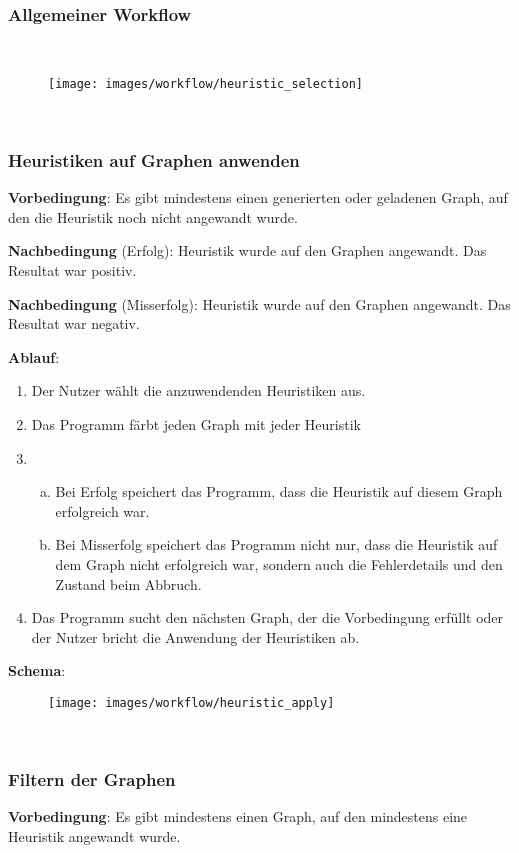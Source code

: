 \documentclass{article}
\begin{document}
	\FloatBarrier
	\subsubsection{Allgemeiner Workflow}
	~\begin{figure}[!h]
		\centering
		\texttt{[image: images/workflow/heuristic\_selection]}
	\end{figure}
	
	
	\FloatBarrier
	~\newpage
	\subsubsection{Heuristiken auf Graphen anwenden}
	\textbf{Vorbedingung}: Es gibt mindestens einen generierten oder geladenen Graph, auf den die Heuristik noch nicht angewandt wurde.
	
	\textbf{Nachbedingung} (Erfolg): Heuristik wurde auf den Graphen angewandt. Das Resultat war positiv.
	
	\textbf{Nachbedingung} (Misserfolg): Heuristik wurde auf den Graphen angewandt. Das Resultat war negativ.
	
	\textbf{Ablauf}:
	\begin{enumerate}[1)]
		\item{Der Nutzer wählt die anzuwendenden Heuristiken aus.}
		\item{Das Programm färbt jeden Graph mit jeder Heuristik}
		\item{
			\begin{enumerate}[a)]
				\item{Bei Erfolg speichert das Programm, dass die Heuristik auf diesem Graph erfolgreich war.}
				\item{Bei Misserfolg speichert das Programm nicht nur, dass die Heuristik auf dem Graph nicht erfolgreich war, sondern auch die Fehlerdetails und den Zustand beim Abbruch.}
			\end{enumerate}
		}
		\item{Das Programm sucht den nächsten Graph, der die Vorbedingung erfüllt oder der Nutzer bricht die Anwendung der Heuristiken ab.}
	\end{enumerate}
	
	\textbf{Schema}:
	~\begin{figure}[!h]
		\centering
		\texttt{[image: images/workflow/heuristic\_apply]}
	\end{figure}
	
	
	
	
	~\newpage
	\subsubsection{Filtern der Graphen}
	\textbf{Vorbedingung}: Es gibt mindestens einen Graph, auf den mindestens eine Heuristik angewandt wurde.
	
\end{document}
